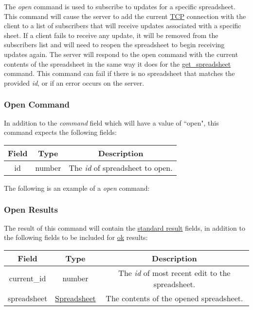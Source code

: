 The \emph{open} command is used to subscribe to updates for a specific spreadsheet. 
This command will cause the server to add the current \href{https://en.wikipedia.org/wiki/Transmission_Control_Protocol}{TCP} 
connection with the client to a list of subscribers that will receive updates 
associated with a specific sheet. If a client fails to receive any update, it 
will be removed from the subscribers list and will need to reopen the 
spreadsheet to begin receiving updates again. The server will respond to the 
open command with the current contents of the spreadsheet in the same way it 
does for the \hyperref[sec:message:get_spreadsheet]{get\_spreadsheet} command. 
This command can fail if there is no spreadsheet that matches the provided \emph{id}, 
or if an error occurs on the server.

\subsubsection{Open Command}
In addition to the \emph{command} field which will have a value of ``open", this command expects the following fields:
\begin{table}[H]
    \begin{center}
        \begin{tabular}{|c|c|c|}\hline
            Field & Type & Description \\\hline
            id & number & The \emph{id} of spreadsheet to open. \\\hline
        \end{tabular}
    \end{center}
\end{table}

The following is an example of a \emph{open} command:


\subsubsection{Open Results}
The result of this command will contain the \hyperref[sec:message:result]{standard result} fields, in addition to the following fields to be included for \underline{ok} results:
\begin{table}[H]
    \begin{center}
        \begin{tabular}{|c|c|c|}\hline
            Field & Type & Description \\\hline
            current\_id & number & The \emph{id} of most recent edit to the spreadsheet. \\\hline
            spreadsheet & \hyperref[sec:message:spreadsheet]{Spreadsheet} & The contents of the opened spreadsheet. \\\hline
        \end{tabular}
    \end{center}
\end{table}

